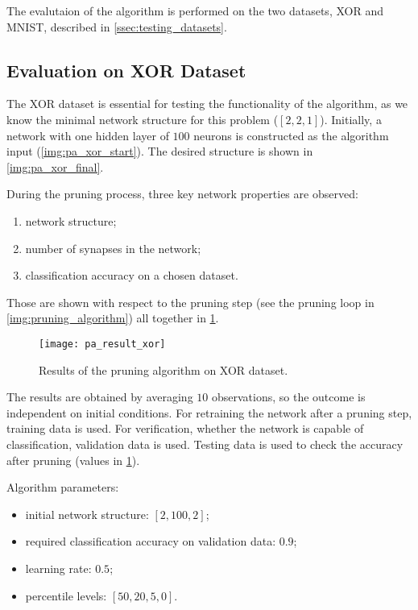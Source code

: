 The evalutaion of the algorithm is performed on the two datasets, XOR and MNIST, described in \cref{ssec:testing_datasets}.

\subsection{Evaluation on XOR Dataset} \label{ssec:evaluation_on_xor}
The XOR dataset is essential for testing the functionality of the algorithm, as we know the minimal network structure for this problem ($ [2, 2, 1] $). Initially, a network with one hidden layer of $ 100 $ neurons is constructed as the algorithm input (\cref{img:pa_xor_start}). The desired structure is shown in \cref{img:pa_xor_final}.

During the pruning process, three key network properties are observed:
\begin{enumerate}
\item network structure;
\item number of synapses in the network;
\item classification accuracy on a chosen dataset.
\end{enumerate}

Those are shown with respect to the pruning step (see the pruning loop in \cref{img:pruning_algorithm}) all together in \cref{fig:pa_result_xor}.

\begin{figure}[H]
  \centering
  \texttt{[image: pa\_result\_xor]}
  \caption{Results of the pruning algorithm on XOR dataset.}
  \label{fig:pa_result_xor}
\end{figure}

The results are obtained by averaging $ 10 $ observations, so the outcome is independent on initial conditions. For retraining the network after a pruning step, training data is used. For verification, whether the network is capable of classification, validation data is used. Testing data is used to check the accuracy after pruning (values in \cref{fig:pa_result_xor}).

Algorithm parameters:
\begin{itemize}
\item initial network structure: $ [2, 100, 2] $;
\item required classification accuracy on validation data: $ 0.9 $;
\item learning rate: $ 0.5 $;
\item percentile levels: $ [50, 20, 5, 0] $.
\end{itemize}

